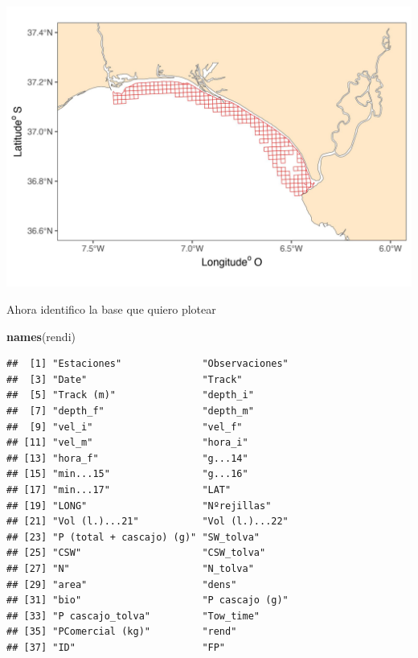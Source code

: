 \documentclass[
]{article}
\newenvironment{Shaded}{\begin{snugshade}}{\end{snugshade}}
\newcommand{\FunctionTok}[1]{\textcolor[rgb]{0.13,0.29,0.53}{\textbf{#1}}}
\newcommand{\NormalTok}[1]{#1}
\begin{document}
\begin{center}\includegraphics{SAR_Method_files/figure-latex/unnamed-chunk-28-1} \end{center}

Ahora identifico la base que quiero plotear

\begin{Shaded}
\begin{Highlighting}[]
\FunctionTok{names}\NormalTok{(rendi)}
\end{Highlighting}
\end{Shaded}

\begin{verbatim}
##  [1] "Estaciones"              "Observaciones"          
##  [3] "Date"                    "Track"                  
##  [5] "Track (m)"               "depth_i"                
##  [7] "depth_f"                 "depth_m"                
##  [9] "vel_i"                   "vel_f"                  
## [11] "vel_m"                   "hora_i"                 
## [13] "hora_f"                  "g...14"                 
## [15] "min...15"                "g...16"                 
## [17] "min...17"                "LAT"                    
## [19] "LONG"                    "Nºrejillas"             
## [21] "Vol (l.)...21"           "Vol (l.)...22"          
## [23] "P (total + cascajo) (g)" "SW_tolva"               
## [25] "CSW"                     "CSW_tolva"              
## [27] "N"                       "N_tolva"                
## [29] "area"                    "dens"                   
## [31] "bio"                     "P cascajo (g)"          
## [33] "P cascajo_tolva"         "Tow_time"               
## [35] "PComercial (kg)"         "rend"                   
## [37] "ID"                      "FP"
\end{verbatim}
\end{document}
